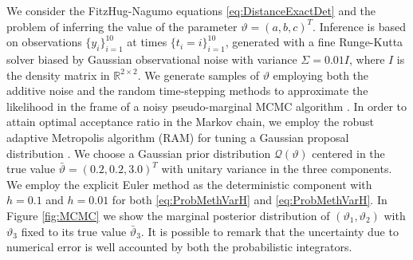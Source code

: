 \documentclass{siamart1116}
\numberwithin{theorem}{section}
\renewcommand{\theta}{\vartheta}
\newcommand{\R}{\mathbb{R}}
\begin{document}
We consider the FitzHug-Nagumo equations \eqref{eq:DistanceExactDet} and the problem of inferring the value of the parameter $\theta = (a, b, c)^T$. Inference is based on observations $\{y_i\}_{i=1}^{10}$ at times $\{t_i = i\}_{i=1}^{10}$, generated with a fine Runge-Kutta solver biased by Gaussian observational noise with variance $\Sigma = 0.01I$, where $I$ is the density matrix in $\R^{2\times 2}$. We generate samples of $\theta$ employing both the additive noise and the random time-stepping methods to approximate the likelihood in the frame of a noisy pseudo-marginal MCMC algorithm \cite{AnR09, MLR16}. In order to attain optimal acceptance ratio in the Markov chain, we employ the robust adaptive Metropolis algorithm (RAM) for tuning a Gaussian proposal distribution \cite{Vih12}. We choose a Gaussian prior distribution $\mathcal{Q}(\theta)$ centered in the true value $\bar \theta = (0.2, 0.2, 3.0)^T$ with unitary variance in the three components. We employ the explicit Euler method as the deterministic component with $h = 0.1$ and $h = 0.01$ for both \eqref{eq:ProbMethVarH} and \eqref{eq:ProbMethVarH}. In Figure \ref{fig:MCMC} we show the marginal posterior distribution of $(\theta_1, \theta_2)$ with $\theta_3$ fixed to its true value $\bar\theta_3$. It is possible to remark that the uncertainty due to numerical error is well accounted by both the probabilistic integrators.  




\end{document}
